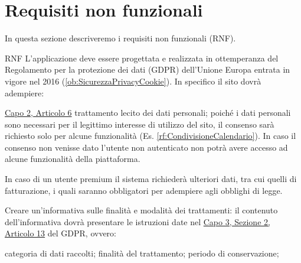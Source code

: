 \section{Requisiti non funzionali}
\label{secD1:RequisitiNonFunzionali}

In questa sezione descriveremo i requisiti non funzionali (RNF).

\begin{listaPersonale}{RNF}
       L'applicazione deve essere progettata e realizzata in ottemperanza del Regolamento per la protezione dei dati (GDPR) dell'Unione Europa entrata in vigore nel 2016 (\ref{ob:SicurezzaPrivacyCookie}). In specifico il sito dovrà adempiere:
      \begin{listaPersonale2}[RNF]{}
             \href{https://eur-lex.europa.eu/legal-content/IT/TXT/?uri=uriserv:OJ.L_.2016.119.01.0001.01.ITA&toc=OJ:L:2016:119:TOC#d1e1898-1-1}{Capo 2, Articolo 6} trattamento lecito dei dati personali; poiché i dati personali sono necessari per il legittimo interesse di utilizzo del sito, il consenso sarà richiesto solo per alcune funzionalità (Es. \ref{rf:CondivisioneCalendario}). In caso il consenso non venisse dato l'utente non autenticato non potrà avere accesso ad alcune funzionalità della piattaforma.
            \begin{listaPersonale3}[RNF]{}
                   In caso di un utente premium il sistema richiederà ulteriori dati, tra cui quelli di fatturazione, i quali saranno obbligatori per adempiere agli obblighi di legge.
            \end{listaPersonale3}

             Creare un'informativa sulle finalità e modalità dei trattamenti: il contenuto dell'informativa dovrà presentare le istruzioni date nel \href{https://eur-lex.europa.eu/legal-content/IT/TXT/?uri=uriserv:OJ.L_.2016.119.01.0001.01.ITA&toc=OJ:L:2016:119:TOC#d1e2261-1-1}{Capo 3, Sezione 2, Articolo 13} del GDPR, ovvero:
            \begin{listaPersonale3}[RNF]{}
                   categoria di dati raccolti;
                   finalità del trattamento;
                   periodo di conservazione;
            \end{listaPersonale3}


\end{listaPersonale2}
\end{listaPersonale}
